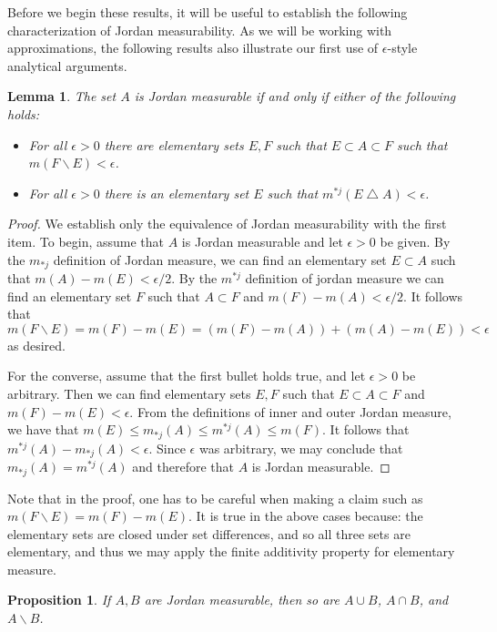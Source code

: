 \documentclass[11pt,oneside]{amsbook}
\renewcommand{\setminus}{\smallsetminus}
\renewcommand{\triangle}{\bigtriangleup}
\theoremstyle{definition}
\theoremstyle{plain}
\newtheorem{lem}[thm]{Lemma}
\newtheorem{prop}[thm]{Proposition}
\theoremstyle{definition}
\theoremstyle{remark}
\numberwithin{equation}{section}
\numberwithin{figure}{section}
\begin{document}
Before we begin these results, it will be useful to establish the following characterization of Jordan measurability. As we will be working with approximations, the following results also illustrate our first use of $\epsilon$-style analytical arguments.

\begin{lem}
  \label{lem:jordan-equiv}
  The set $A$ is Jordan measurable if and only if either of the following holds:
  \begin{itemize}
  \item For all $\epsilon>0$ there are elementary sets $E,F$ such that $E\subset A\subset F$ such that $m(F\setminus E)<\epsilon$.
  \item For all $\epsilon>0$ there is an elementary set $E$ such that $m^{*j}(E\triangle A)<\epsilon$.
  \end{itemize}
\end{lem}

\begin{proof}
  We establish only the equivalence of Jordan measurability with the first item. To begin, assume that $A$ is Jordan measurable and let $\epsilon>0$ be given. By the $m_{*j}$ definition of Jordan measure, we can find an elementary set $E\subset A$ such that $m(A)-m(E)<\epsilon/2$. By the $m^{*j}$ definition of jordan measure we can find an elementary set $F$ such that $A\subset F$ and $m(F)-m(A)<\epsilon/2$. It follows that 
\[m(F\setminus E)=m(F)-m(E)=(m(F)-m(A))+(m(A)-m(E))<\epsilon
\]
as desired.

  For the converse, assume that the first bullet holds true, and let $\epsilon>0$ be arbitrary. Then we can find elementary sets $E,F$ such that $E\subset A\subset F$ and $m(F)-m(E)<\epsilon$. From the definitions of inner and outer Jordan measure, we have that $m(E)\leq m_{*j}(A)\leq m^{*j}(A)\leq m(F)$. It follows that $m^{*j}(A)-m_{*j}(A)<\epsilon$. Since $\epsilon$ was arbitrary, we may conclude that $m_{*j}(A)=m^{*j}(A)$ and therefore that $A$ is Jordan measurable.
\end{proof}

Note that in the proof, one has to be careful when making a claim such as $m(F\setminus E)=m(F)-m(E)$. It is true in the above cases because: the elementary sets are closed under set differences, and so all three sets are elementary, and thus we may apply the finite additivity property for elementary measure.

\begin{prop}
  \label{prop:jordan-closure}
  If $A,B$ are Jordan measurable, then so are $A\cup B$, $A\cap B$, and $A\setminus B$.
\end{prop}
\end{document}
